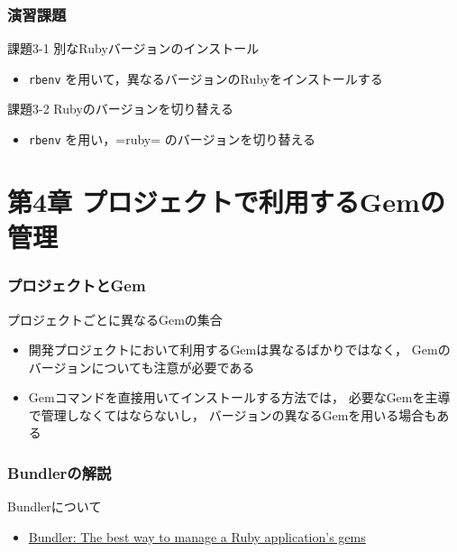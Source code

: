 \documentclass[t, aspectratio=169]{beamer}
\begin{document}
\section{演習課題}
\label{sec-3-2}
\begin{frame}[fragile,label=sec-3-2-1]{課題3-1 別なRubyバージョンのインストール}
 \begin{itemize}
\item \texttt{rbenv} を用いて，異なるバージョンのRubyをインストールする
\end{itemize}
\end{frame}

\begin{frame}[fragile,label=sec-3-2-2]{課題3-2 Rubyのバージョンを切り替える}
 \begin{itemize}
\item \texttt{rbenv} を用い，=ruby= のバージョンを切り替える
\end{itemize}
\end{frame}

\part{第4章 プロジェクトで利用するGemの管理}
\label{sec-4}
\section{プロジェクトとGem}
\label{sec-4-1}
\begin{frame}[label=sec-4-1-1]{プロジェクトごとに異なるGemの集合}
\begin{itemize}
\item 開発プロジェクトにおいて利用するGemは異なるばかりではなく，
Gemのバージョンについても注意が必要である
\item Gemコマンドを直接用いてインストールする方法では，
必要なGemを主導で管理しなくてはならないし，
バージョンの異なるGemを用いる場合もある
\end{itemize}
\end{frame}

\section{Bundlerの解説}
\label{sec-4-2}
\begin{frame}[label=sec-4-2-1]{Bundlerについて}
\begin{itemize}
\item \href{http://bundler.io/}{Bundler: The best way to manage a Ruby application's gems}
\end{itemize}
\end{frame}
\end{document}
